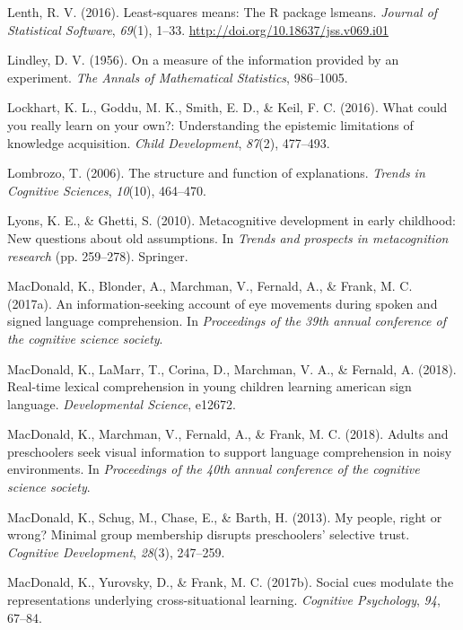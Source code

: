 \documentclass[oneside]{report}
\begin{document}
\hypertarget{ref-lenth2016lsmeans}{}
Lenth, R. V. (2016). Least-squares means: The R package lsmeans.
\emph{Journal of Statistical Software}, \emph{69}(1), 1--33.
\url{http://doi.org/10.18637/jss.v069.i01}

\hypertarget{ref-lindley1956measure}{}
Lindley, D. V. (1956). On a measure of the information provided by an
experiment. \emph{The Annals of Mathematical Statistics}, 986--1005.

\hypertarget{ref-lockhart2016could}{}
Lockhart, K. L., Goddu, M. K., Smith, E. D., \& Keil, F. C. (2016). What
could you really learn on your own?: Understanding the epistemic
limitations of knowledge acquisition. \emph{Child Development},
\emph{87}(2), 477--493.

\hypertarget{ref-lombrozo2006structure}{}
Lombrozo, T. (2006). The structure and function of explanations.
\emph{Trends in Cognitive Sciences}, \emph{10}(10), 464--470.

\hypertarget{ref-lyons2010metacognitive}{}
Lyons, K. E., \& Ghetti, S. (2010). Metacognitive development in early
childhood: New questions about old assumptions. In \emph{Trends and
prospects in metacognition research} (pp. 259--278). Springer.

\hypertarget{ref-macdonald2017info}{}
MacDonald, K., Blonder, A., Marchman, V., Fernald, A., \& Frank, M. C.
(2017a). An information-seeking account of eye movements during spoken
and signed language comprehension. In \emph{Proceedings of the 39th
annual conference of the cognitive science society}.

\hypertarget{ref-macdonald2018real}{}
MacDonald, K., LaMarr, T., Corina, D., Marchman, V. A., \& Fernald, A.
(2018). Real-time lexical comprehension in young children learning
american sign language. \emph{Developmental Science}, e12672.

\hypertarget{ref-macdonald2018noise}{}
MacDonald, K., Marchman, V., Fernald, A., \& Frank, M. C. (2018). Adults
and preschoolers seek visual information to support language
comprehension in noisy environments. In \emph{Proceedings of the 40th
annual conference of the cognitive science society}.

\hypertarget{ref-macdonald2013my}{}
MacDonald, K., Schug, M., Chase, E., \& Barth, H. (2013). My people,
right or wrong? Minimal group membership disrupts preschoolers'
selective trust. \emph{Cognitive Development}, \emph{28}(3), 247--259.

\hypertarget{ref-macdonald2017social}{}
MacDonald, K., Yurovsky, D., \& Frank, M. C. (2017b). Social cues
modulate the representations underlying cross-situational learning.
\emph{Cognitive Psychology}, \emph{94}, 67--84.
\end{document}
